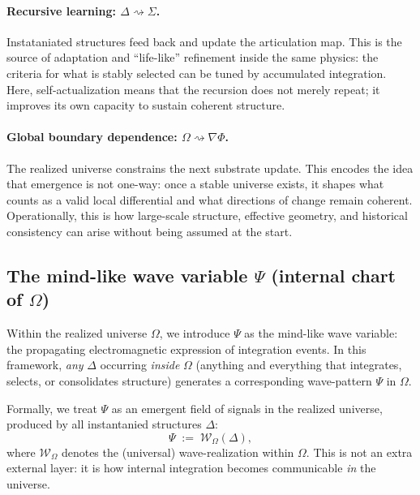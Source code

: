 \documentclass[11pt]{article}
\begin{document}
\paragraph{Recursive learning: $\Delta \rightsquigarrow \Sigma$.}
Instataniated structures feed back and update the articulation map.
This is the source of adaptation and ``life-like'' refinement inside the same physics: the criteria for what is stably
selected can be tuned by accumulated integration.
Here, self-actualization means that the recursion does not merely repeat; it improves its own capacity to sustain coherent
structure.

\paragraph{Global boundary dependence: $\Omega \rightsquigarrow \nabla\Phi$.}
The realized universe constrains the next substrate update.
This encodes the idea that emergence is not one-way: once a stable universe exists, it shapes what counts as a valid local
differential and what directions of change remain coherent.
Operationally, this is how large-scale structure, effective geometry, and historical consistency can arise without being
assumed at the start.

\subsection{The mind-like wave variable \texorpdfstring{$\Psi$ (internal chart of $\Omega$)}{Psi (internal chart of Omega)}}
\label{subsec:psi_mindlike_wave}

Within the realized universe $\Omega$, we introduce $\Psi$ as the mind-like wave variable: the propagating
electromagnetic expression of integration events.
In this framework, \emph{any} $\Delta$ occurring \emph{inside} $\Omega$ (anything and everything that integrates, selects,
or consolidates structure) generates a corresponding wave-pattern $\Psi$ in $\Omega$.

Formally, we treat $\Psi$ as an emergent field of signals in the realized universe, produced by all instantanied structures $\Delta$:
\begin{equation}
\label{eq:psi_from_delta}
\Psi \;:=\; \mathcal{W}_{\Omega}(\Delta),
\end{equation}
where $\mathcal{W}_{\Omega}$ denotes the (universal) wave-realization within $\Omega$.
This is not an extra external layer: it is how internal integration becomes communicable \emph{in} the universe.
\end{document}
